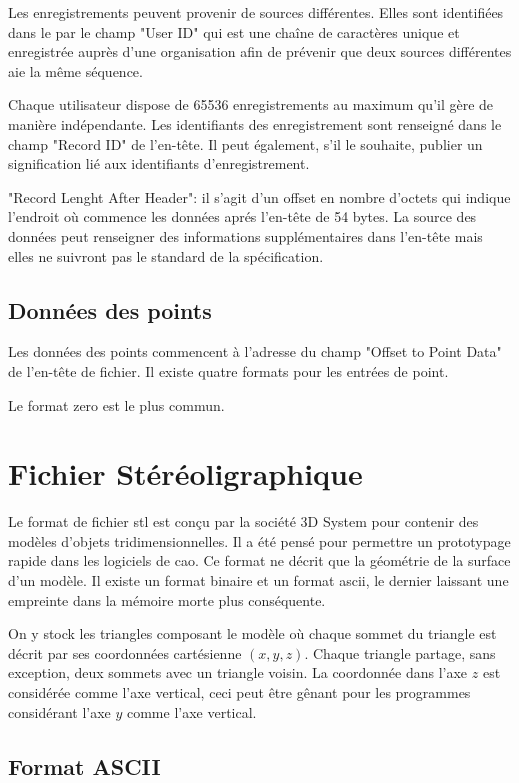 Les enregistrements peuvent provenir de sources différentes.
Elles sont identifiées dans le par le champ "User ID" qui est une chaîne de caractères unique et enregistrée auprès d'une organisation afin de prévenir que deux sources différentes aie la même séquence.

Chaque utilisateur dispose de 65536 enregistrements au maximum qu'il gère de manière indépendante.
Les identifiants des enregistrement sont renseigné dans le champ "Record ID" de l'en-tête.
Il peut également, s'il le souhaite, publier un signification lié aux identifiants d'enregistrement.

"Record Lenght After Header": il s'agit d'un offset en nombre d'octets qui indique l'endroit où commence les données aprés l'en-tête de 54 bytes.
La source des données peut renseigner des informations supplémentaires dans l'en-tête mais elles ne suivront pas le standard de la spécification.

\subsection{Données des points}
Les données des points commencent à l'adresse du champ "Offset to Point Data" de l'en-tête de fichier.
Il existe quatre formats pour les entrées de point. 

Le format zero est le plus commun. 

\section{Fichier Stéréoligraphique}

Le format de fichier \gls{stl} est conçu par la société 3D System pour contenir des modèles d'objets tridimensionnelles.
Il a été pensé pour permettre un prototypage rapide dans les logiciels de \gls{cao}. 
Ce format ne décrit que la géométrie de la surface d'un modèle.
Il existe un format binaire et un format ascii, le dernier laissant une empreinte dans la mémoire morte plus conséquente.

On y stock les triangles composant le modèle où chaque sommet du triangle est décrit par ses coordonnées cartésienne $(x,y,z)$. Chaque triangle partage, sans exception, deux sommets avec un triangle voisin.
La coordonnée dans l'axe $z$ est considérée comme l'axe vertical, ceci peut être gênant pour les programmes considérant l'axe $y$ comme l'axe vertical.

\subsection{Format ASCII}

